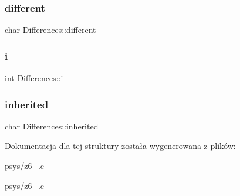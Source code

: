 \subsubsection{\texorpdfstring{different}{different}}
{\footnotesize\ttfamily char Differences\+::different}

\mbox{\label{structDifferences_aa157372af0f0f89046229ee794c8302c}} 
\subsubsection{\texorpdfstring{i}{i}}
{\footnotesize\ttfamily int Differences\+::i}

\mbox{\label{structDifferences_a456dfa95ee434d6fc3d708b79426a5e0}} 
\subsubsection{\texorpdfstring{inherited}{inherited}}
{\footnotesize\ttfamily char Differences\+::inherited}



Dokumentacja dla tej struktury została wygenerowana z plików\+:\begin{DoxyCompactItemize}
\item 
psys/\mbox{\hyperlink{z6__11_8c}{z6\+\_.\+c}}\item 
psys/\mbox{\hyperlink{z6__12_8c}{z6\+\_.\+c}}\end{DoxyCompactItemize}
